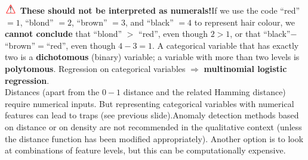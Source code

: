 \documentclass[20pt,landscape,footrule,headrule]{foils}
\newcommand{\newl}{\newline\newline}
\newcommand\Warning{%
 \makebox[1.4em][c]{%
 \makebox[0pt][c]{\raisebox{.1em}{!}}%
 \makebox[0pt][c]{\color{red}\Large$\bigtriangleup$}}}%
\begin{document}
{{\newl $\Warning$ \textbf{These should not be interpreted as numerals!}\newl If we use the code  ``red'' $=1$, ``blond'' $=2$, ``brown'' $=3$, and ``black'' $=4$ to represent hair colour, we \textbf{cannot conclude} that ``blond'' $>$ ``red'', even though $2>1$, or that ``black''$-$``brown''$=$``red'', even though $4-3=1$.   
\newl A categorical variable that has exactly two  is a \textbf{dichotomous} (binary) variable; a variable with more than two levels is \textbf{polytomous}. \newl Regression  on categorical variables $\Longrightarrow$ \textbf{multinomial logistic regression}.
\newpage\ \\ \noindent 
Distances (apart from the $0-1$ distance and the related Hamming distance) require numerical inputs. \newl But representing categorical variables with numerical features can lead to traps (see previous slide).\newl Anomaly detection methods based on distance or on density are not recommended in the qualitative context (unless the distance function has been modified appropriately). \newl 
Another option is to look at combinations of feature levels, but this can be computationally expensive. 



}}
\end{document}
